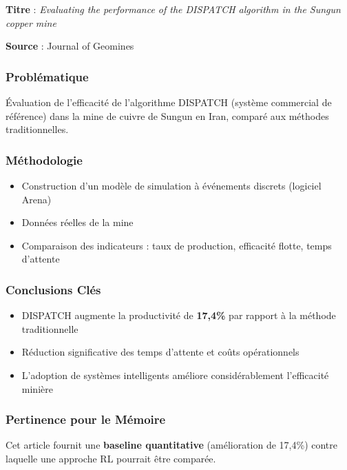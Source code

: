 \documentclass[12pt,a4paper]{article}
\begin{document}
\textbf{Titre} : \textit{Evaluating the performance of the DISPATCH algorithm in the Sungun copper mine}

\textbf{Source} : Journal of Geomines

\subsubsection{Problématique}

Évaluation de l'efficacité de l'algorithme DISPATCH (système commercial de référence) dans la mine de cuivre de Sungun en Iran, comparé aux méthodes traditionnelles.

\subsubsection{Méthodologie}

\begin{itemize}
    \item Construction d'un modèle de simulation à événements discrets (logiciel Arena)
    \item Données réelles de la mine
    \item Comparaison des indicateurs : taux de production, efficacité flotte, temps d'attente
\end{itemize}

\subsubsection{Conclusions Clés}

\begin{itemize}
    \item DISPATCH augmente la productivité de \textbf{17,4\%} par rapport à la méthode traditionnelle
    \item Réduction significative des temps d'attente et coûts opérationnels
    \item L'adoption de systèmes intelligents améliore considérablement l'efficacité minière
\end{itemize}

\subsubsection{Pertinence pour le Mémoire}

Cet article fournit une \textbf{baseline quantitative} (amélioration de 17,4\%) contre laquelle une approche RL pourrait être comparée.

\end{document}
